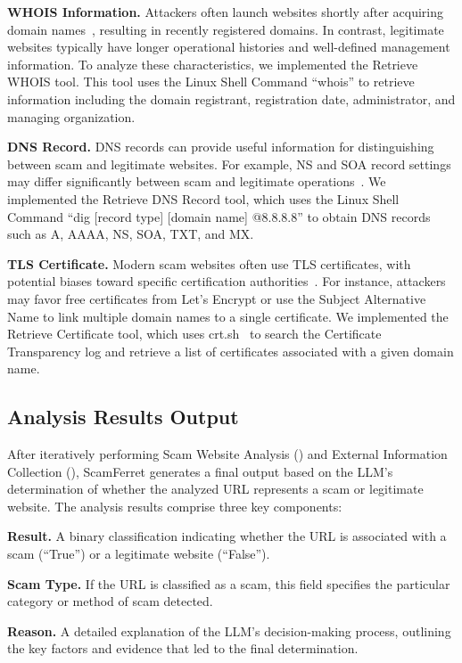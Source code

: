 \documentclass[runningheads]{llncs}
\begin{document}
\noindent\textbf{WHOIS Information.}
Attackers often launch websites shortly after acquiring domain names~\cite{DBLP:conf/uss/OestZWNBZTDA20}, resulting in recently registered domains.
In contrast, legitimate websites typically have longer operational histories and well-defined management information.
To analyze these characteristics, we implemented the Retrieve WHOIS tool.
This tool uses the Linux Shell Command ``whois'' to retrieve information including the domain registrant, registration date, administrator, and managing organization.

\noindent\textbf{DNS Record.}
DNS records can provide useful information for distinguishing between scam and legitimate websites.
For example, NS and SOA record settings may differ significantly between scam and legitimate operations~\cite{DBLP:conf/imc/HaoFP11}.
We implemented the Retrieve DNS Record tool, which uses the Linux Shell Command ``dig [record type] [domain name] @8.8.8.8'' to obtain DNS records such as A, AAAA, NS, SOA, TXT, and MX.

\noindent\textbf{TLS Certificate.}
Modern scam websites often use TLS certificates, with potential biases toward specific certification authorities~\cite{DBLP:conf/asiaccs/KimCKDSAD21}.
For instance, attackers may favor free certificates from Let's Encrypt or use the Subject Alternative Name to link multiple domain names to a single certificate.
We implemented the Retrieve Certificate tool, which uses crt.sh~\cite{crtsh} to search the Certificate Transparency log and retrieve a list of certificates associated with a given domain name.

\subsection{ Analysis Results Output}
After iteratively performing Scam Website Analysis () and External Information Collection (), ScamFerret generates a final output based on the LLM's determination of whether the analyzed URL represents a scam or legitimate website.
The analysis results comprise three key components:

\noindent\textbf{Result.} A binary classification indicating whether the URL is associated with a scam (``True'') or a legitimate website (``False'').

\noindent\textbf{Scam Type.} If the URL is classified as a scam, this field specifies the particular category or method of scam detected.

\noindent\textbf{Reason.} A detailed explanation of the LLM's decision-making process, outlining the key factors and evidence that led to the final determination.
\end{document}
